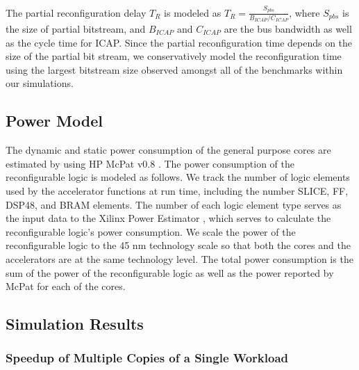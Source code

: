The partial reconfiguration delay $T_R$ is modeled as $ T_R = \frac{S_{pbs}}{ B_{ICAP} / C_{ICAP}} $,
where $S_{pbs}$ is the size of
partial bitstream, and $B_{ICAP}$ and $C_{ICAP}$ are the bus bandwidth
as well as the cycle time for ICAP.
Since the partial reconfiguration time depends on the size of the partial bit
stream, we conservatively model the reconfiguration time using the
largest bitstream size observed amongst all of the benchmarks within our simulations. 


\subsection{Power Model}
The dynamic and static power consumption of the general purpose cores are
estimated by using HP McPat v0.8 \cite{mcpat}. The power consumption of the reconfigurable logic
is modeled as follows. We track the number of
logic elements used by the accelerator functions at run time, 
including the number SLICE, FF, DSP48, and BRAM elements. The number of each logic element type serves as the input data to the 
Xilinx Power Estimator
\cite{xpe}, which serves to calculate the reconfigurable logic's power consumption.  
We scale the power of the reconfigurable logic to the 45 nm technology scale
so that both the cores and the accelerators are at the same technology
level. The total power consumption is the sum of the power of
the reconfigurable logic as well as the power reported by McPat for each of the
cores. 


\subsection{Simulation Results}
\label{sec_simu_result}

\subsubsection{Speedup of Multiple Copies of a Single Workload}

